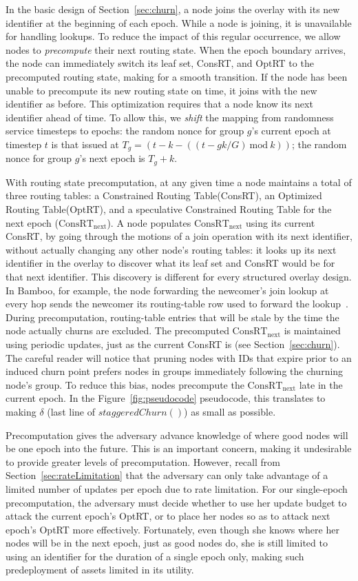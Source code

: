 \documentclass[10pt,twocolumn]{article}
\newcommand{\PRT}{OptRT\xspace}
\newcommand{\fullPRT}{Optimized Routing Table\xspace}
\newcommand{\CRT}{ConsRT\xspace}
\newcommand{\fullCRT}{Constrained Routing Table\xspace}
\newcommand{\CRTNext}{$\mathrm{\CRT}_{\mbox{next}}$\xspace}
\begin{document}
In the basic design of Section~\ref{sec:churn}, a node joins the overlay
with its new identifier at the beginning of each epoch.  While a node
is joining, it is unavailable for handling lookups.  To reduce the
impact of this regular occurrence, we allow nodes to \emph{precompute}
their next routing state.  When the epoch
boundary arrives, the node can immediately switch its leaf set, \CRT, and \PRT
to the precomputed routing state, making for a smooth transition.  If
the node has been unable to precompute its new routing
state on time, it joins with the new identifier as before.
This optimization requires that a
node know its next identifier ahead of time.  To
allow this, we \emph{shift} the mapping from randomness service timesteps to
epochs:  the random nonce for group $g$'s current epoch at
timestep $t$ is that issued at $T_g = (t - k - ((t - gk/G) \mathrm{\ mod\ }
k))$; the random nonce for group $g$'s next epoch is
$T_g + k$.

With routing state precomputation, at any given time a node maintains a
total of three routing
tables: a \fullCRT (\CRT), an \fullPRT (\PRT), and a speculative \fullCRT for the
next epoch (\CRTNext).
A node populates \CRTNext using its current
\CRT, by going through the motions of a join operation with its next identifier,
without actually changing any other node's routing tables: it looks up
its next identifier in the overlay to discover what
its leaf set and \CRT would be for that next
identifier.  This discovery is different for every structured overlay design.  In
Bamboo, for example, the node forwarding the newcomer's join lookup at every hop
sends the newcomer its routing-table row used to forward the lookup~\cite{Rhea2004}.
During precomputation, routing-table entries that will be stale by the time the node 
actually churns are excluded.  The precomputed \CRTNext is maintained using
periodic updates, just as the current \CRT is (see Section~\ref{sec:churn}). The careful
reader will notice that pruning nodes with IDs that expire prior to an induced churn point 
prefers nodes in groups immediately following the churning node's
group. To reduce this bias, nodes precompute the \CRTNext late in the current epoch. 
In the Figure~\ref{fig:pseudocode} pseudocode, this translates to making $\delta$ 
(last line of $staggeredChurn()$) as small as possible. 

Precomputation gives the adversary advance knowledge of 
where good nodes will be one epoch into the future.  This is an
important concern, making it undesirable to provide greater levels of
precomputation.  However, recall from
Section~\ref{sec:rateLimitation} that the adversary can only take
advantage of a
limited number of updates per epoch due to rate limitation.  For our single-epoch precomputation, the
adversary must decide whether to use her update budget to attack the
current epoch's \PRT, or to place her nodes so as to attack next epoch's
\PRT more effectively. Fortunately, even though she knows where her
nodes will be in the next epoch, just as good nodes do, she is still
limited to using an identifier for the duration of a single epoch only,
making such predeployment of assets limited in its utility.
\end{document}
